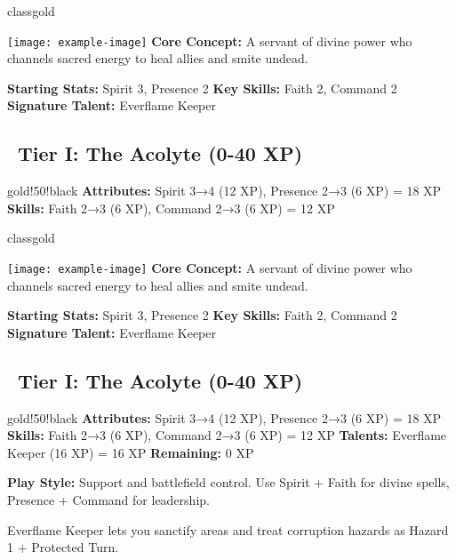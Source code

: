 \documentclass[11pt]{article}
\begin{document}
\newpage

\begin{classguide}{classgold}
\begin{multicols}{2}
\texttt{[image: example-image]}
\columnbreak
\textbf{Core Concept:} A servant of divine power who channels sacred energy to heal allies and smite undead.

\textbf{Starting Stats:} Spirit 3, Presence 2
\textbf{Key Skills:} Faith 2, Command 2
\textbf{Signature Talent:} Everflame Keeper
\end{multicols}

\subsection*{\faStar\ Tier I: The Acolyte (0-40 XP)}
\begin{tierbox}{gold!50!black}
\textbf{Attributes:} Spirit 3→4 (12 XP), Presence 2→3 (6 XP) = 18 XP
\textbf{Skills:} Faith 2→3 (6 XP), Command 2→3 (6 XP) = 12 XP
\begin{classguide}{classgold}
\begin{multicols}{2}
\texttt{[image: example-image]}
\columnbreak
\textbf{Core Concept:} A servant of divine power who channels sacred energy to heal allies and smite undead.

\textbf{Starting Stats:} Spirit 3, Presence 2
\textbf{Key Skills:} Faith 2, Command 2
\textbf{Signature Talent:} Everflame Keeper
\end{multicols}

\subsection*{\faStar\ Tier I: The Acolyte (0-40 XP)}
\begin{tierbox}{gold!50!black}
\textbf{Attributes:} Spirit 3→4 (12 XP), Presence 2→3 (6 XP) = 18 XP
\textbf{Skills:} Faith 2→3 (6 XP), Command 2→3 (6 XP) = 12 XP
\textbf{Talents:} Everflame Keeper (16 XP) = 16 XP
\textbf{Remaining:} 0 XP
\end{tierbox}

\textbf{Play Style:} Support and battlefield control. Use Spirit + Faith for divine spells, Presence + Command for leadership.

\begin{tipbox}
Everflame Keeper lets you sanctify areas and treat corruption hazards as Hazard 1 + Protected Turn.
\end{tipbox}


\end{classguide}
\end{tierbox}
\end{classguide}
\end{document}
